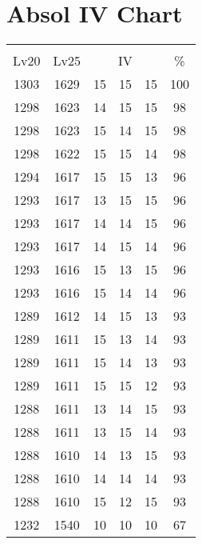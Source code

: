 \documentclass{article}%
\begin{document}
%
\normalsize%
\section{Absol IV Chart}%
\label{sec:Absol IV Chart}%
\renewcommand{\arraystretch}{1.5}%
\begin{tabular}{|c|c|c|c|c|c|}%
\hline%
\multicolumn{6}{|c|}{\textcolor{white}{ 
\linebreak{Absol}
}%
\cellcolor{black}}\\%
\multicolumn{1}{|c}{Lv20}&\multicolumn{1}{c|}{Lv25}&\multicolumn{3}{c|}{IV}&\multicolumn{1}{|c|}{\%}\\%
\hline%
\rowcolor{color100}%
1303&1629&15&15&15&100\\%
\hline%
\rowcolor{color98}%
1298&1623&14&15&15&98\\%
\hline%
\rowcolor{color98}%
1298&1623&15&14&15&98\\%
\hline%
\rowcolor{color98}%
1298&1622&15&15&14&98\\%
\hline%
\rowcolor{color96}%
1294&1617&15&15&13&96\\%
\hline%
\rowcolor{color96}%
1293&1617&13&15&15&96\\%
\hline%
\rowcolor{color96}%
1293&1617&14&14&15&96\\%
\hline%
\rowcolor{color96}%
1293&1617&14&15&14&96\\%
\hline%
\rowcolor{color96}%
1293&1616&15&13&15&96\\%
\hline%
\rowcolor{color96}%
1293&1616&15&14&14&96\\%
\hline%
\rowcolor{color93}%
1289&1612&14&15&13&93\\%
\hline%
\rowcolor{color93}%
1289&1611&15&13&14&93\\%
\hline%
\rowcolor{color93}%
1289&1611&15&14&13&93\\%
\hline%
\rowcolor{color93}%
1289&1611&15&15&12&93\\%
\hline%
\rowcolor{color93}%
1288&1611&13&14&15&93\\%
\hline%
\rowcolor{color93}%
1288&1611&13&15&14&93\\%
\hline%
\rowcolor{color93}%
1288&1610&14&13&15&93\\%
\hline%
\rowcolor{color93}%
1288&1610&14&14&14&93\\%
\hline%
\rowcolor{color93}%
1288&1610&15&12&15&93\\%
\hline%
\rowcolor{color91}%
1232&1540&10&10&10&67\\%
\end{tabular}

%
\end{document}
